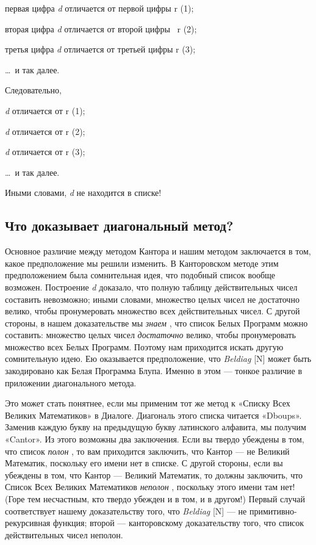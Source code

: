 \documentclass[../main.tex]{subfiles}
\begin{document}
первая цифра \emph{d} отличается от первой цифры r (1);

вторая цифра \emph{d} отличается от второй цифры~ r (2);

третья цифра \emph{d} отличается от третьей цифры r (3);

\ldots~и так далее.

Следовательно,

\emph{d} отличается от r (1);

\emph{d} отличается от r (2);

\emph{d} отличается от r (3);

\ldots~и так далее.

Иными словами, \emph{d} не находится в списке!


\subsection{Что доказывает диагональный метод?}

Основное различие между методом Кантора и нашим методом заключается в том, какое предположение мы решили изменить. В Канторовском методе этим предположением была сомнительная идея, что подобный список вообще возможен. Построение \emph{d} доказало, что полную таблицу действительных чисел составить невозможно; иными словами, множество целых чисел не достаточно велико, чтобы пронумеровать множество всех действительных чисел. С другой стороны, в нашем доказательстве мы \emph{знаем} , что список Белых Программ можно составить: множество целых чисел \emph{достаточно} велико, чтобы пронумеровать множество всех Белых Программ. Поэтому нам приходится искать другую сомнительную идею. Ею оказывается предположение, что \emph{Beldiag} {[}N{]} может быть закодировано как Белая Программа Блупа. Именно в этом --- тонкое различие в приложении диагонального метода.

Это может стать понятнее, если мы применим тот же метод к «Списку Всех Великих Математиков» в Диалоге. Диагональ этого списка читается «Dboups». Заменив каждую букву на предыдущую букву латинского алфавита, мы получим «Cantor». Из этого возможны два заключения. Если вы твердо убеждены в том, что список \emph{полон} , то вам приходится заключить, что Кантор --- не Великий Математик, поскольку его имени нет в списке. С другой стороны, если вы убеждены в том, что Кантор --- Великий Математик, то должны заключить, что Список Всех Великих Математиков \emph{неполон} , поскольку этого имени там нет! (Горе тем несчастным, кто твердо убежден и в том, и в другом!) Первый случай соответствует нашему доказательству того, что \emph{Beldiag} {[}N{]} --- не примитивно-рекурсивная функция; второй --- канторовскому доказательству того, что список действительных чисел неполон.
\end{document}
